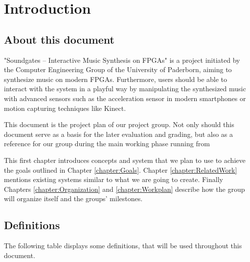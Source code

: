 \chapter{Introduction}
	\label{chapter:Introduction}
	\section{About this document}
	
"Soundgates – Interactive Music Synthesis on FPGAs" is a project initiated by the Computer Engineering Group of the University of Paderborn, aiming to synthesize music on modern FPGAs. 
Furthermore, users should be able to interact with the system in a playful way by manipulating the synthesized music with advanced sensors such as the acceleration sensor in modern smartphones or motion capturing techniques like Kinect.


This document is the project plan of our project group.
Not only should this document serve as a basis for the later evaluation and grading, 
but also as a reference for our group during the main working phase running from 

This first chapter introduces concepts and system that we plan to use to achieve the goals outlined in Chapter \ref{chapter:Goals}. 
Chapter \ref{chapter:RelatedWork} mentions existing systems similar to what we are going to create.
Finally Chapters \ref{chapter:Organization} and \ref{chapter:Workplan} describe how the group will organize itself and the groups' milestones.

	\section{Definitions}
	 The following table displays some definitions, that will be used throughout this document.
	
	 
